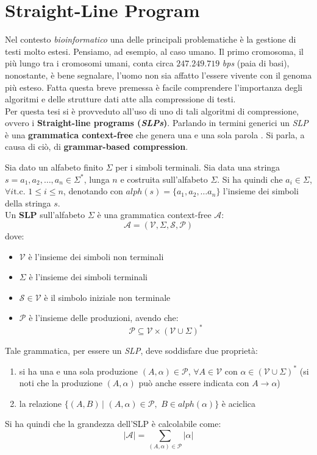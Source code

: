 \section{Straight-Line Program}
\label{slpsec}
Nel contesto \textit{bioinformatico} una delle principali problematiche è la
gestione di testi molto estesi. Pensiamo, ad esempio, al caso umano. Il primo
cromosoma, il più lungo tra i cromosomi umani, conta circa $247.249.719$
\textit{bps} (paia di basi), nonostante, è bene segnalare, l'uomo
non sia affatto l'essere vivente con il genoma più esteso. Fatta questa breve
premessa è facile comprendere l'importanza degli algoritmi e delle strutture
dati atte alla compressione di testi.\\
Per questa tesi si è provveduto all'uso di uno di tali algoritmi di
compressione, ovvero i \textbf{Straight-line programs (\textit{SLPs})}. Parlando
in termini generici un \textit{SLP} è una \textbf{grammatica context-free} che
genera una e una sola parola \cite{slpsurvey}. Si parla, a causa di ciò, di
\textbf{grammar-based compression}.
\begin{definizione}
  Sia dato un alfabeto finito $\Sigma$ per i simboli terminali. Sia data una
  stringa $s=a_1,a_2,\ldots, a_n\in\Sigma^{*}$, lunga $n$ e costruita
  sull'alfabeto $\Sigma$. Si ha quindi che $a_i\in\Sigma$, $\forall i \mbox{
    t.c. }1\leq i\leq n$, denotando con $alph(s)=\{a_1,a_2,\ldots
  a_n\}$ l'insieme dei simboli della stringa $s$.\\
  Un \textbf{SLP} sull'alfabeto $\Sigma$ è una grammatica context-free
  $\mathcal{A}$: 
  \[\mathcal{A}=\left(\mathcal{V}, \Sigma, \mathcal{S}, \mathcal{P}\right)\]
  dove:
  \begin{itemize}
    \item $\mathcal{V}$ è l'insieme dei simboli non terminali
    \item $\Sigma$ è l'insieme dei simboli terminali
    \item $\mathcal{S}\in \mathcal{V}$ è il simbolo iniziale non terminale
    \item $\mathcal{P}$ è l'insieme delle produzioni, avendo che:
    \[\mathcal{P}\subseteq \mathcal{V}\times\left(\mathcal{V}\cup
        \Sigma\right)^{*}\] 
  \end{itemize}
  Tale grammatica, per essere un \textit{SLP}, deve soddisfare due proprietà:
  \begin{enumerate}
    \item si ha una e una sola produzione $(A,\alpha)\in \mathcal{P}$, $\forall
    A\in \mathcal{V}$ con $\alpha\in \left(\mathcal{V}\cup\Sigma\right)^{*}$ (si
    noti che la produzione $(A,\alpha)$ può anche essere indicata con
    $A\to\alpha$) 
    \item la relazione $\{(A,B)\,|\,\,(A,\alpha)\in\mathcal{P},\,\,B\in
    alph(\alpha)\}$ è aciclica
  \end{enumerate}
  Si ha quindi che la grandezza dell'SLP è calcolabile come:
  \[|\mathcal{A}| = \sum_{(A,\alpha)\in\mathcal{P}}|\alpha|\]
\end{definizione}
